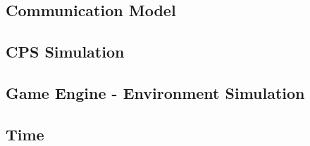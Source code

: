 \subsection{Communication Model} %
\label{sub:communication_model}

\subsection{CPS Simulation} %
\label{sub:cps_simulation}


\subsection{Game Engine - Environment Simulation} %
\label{sub:environment_simulation}


\subsection{Time} %
\label{sub:time}

